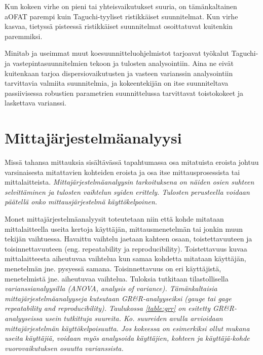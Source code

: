 \documentclass[12pt,a4paper,finnish]{tutthesis}
\begin{document}
Kun kokeen virhe on pieni
tai yhteisvaikutukset suuria, on
tämänkaltainen aOFAT parempi kuin Taguchi-tyyliset ristikkäiset suunnitelmat.
Kun virhe kasvaa, tietyssä pisteessä ristikkäiset suunnitelmat osoittatuvat
kuitenkin paremmiksi.


Minitab ja useimmat muut koesuunnitteluohjelmistot tarjoavat työkalut
Taguchi- ja vastepintasuunnitelmien tekoon ja tulosten analysointiin.
Aina ne eivät kuitenkaan tarjoa dispersiovaikutusten ja vasteen varianssin
analysointiin tarvittavia valmiita suunnitelmia, ja kokeentekijän
on itse suunniteltava passiivisessa robustien parametrien suunnittelussa
tarvittavat toistokokeet ja laskettava varianssi.



\chapter{Mittajärjestelmäanalyysi}
\label{ch:grr}


Missä tahansa mittauksia sisältävässä tapahtumassa osa mitatuista
eroista johtuu varsinaisesta mitattavien kohteiden eroista ja osa itse mittausprosessista
tai mittalaitteista. \em Mittajärjestelmäanalyysin \em tarkoituksena
on näiden osien suhteen selvittäminen ja tulosten vaihtelun syiden erittely.
Tulosten perusteella voidaan päätellä onko mittausjärjestelmä käyttökelpoinen.



Monet mittajärjestelmäanalyysit toteutetaan niin että kohde mitataan
mittalaitteella useita kertoja käyttäjän, mittausmenetelmän tai jonkin muun
tekijän vaihtuessa. Havaittu vaihtelu jaetaan kahteen osaan, toistettavuuteen
ja toisinnettavuuteen (eng. repeatability ja reproducibility). Toistettavuus
kuvaa mittalaitteesta aiheutuvaa vaihtelua kun samaa
kohdetta mitataan käyttäjän, menetelmän jne. pysyessä samana. Toisinnettavuus
on eri käyttäjistä, menetelmistä jne. aiheutuvaa vaihtelua.
Tuloksia tutkitaan tilastollisella \em varianssianalyysilla \em (ANOVA, analysis of variance).
Tämänkaltaisia mittajärjestelmäanalyyseja kutsutaan GR\&R-analyyseiksi
(gauge tai gage repeatability and reproducibility).
Taulukossa \ref{table:grr} on esitetty GR\&R-analyyseissa usein tutkittuja
suureita. Ko. suureiden avulla arvioidaan mittajärjestelmän käyttökelpoisuutta.
Jos kokeessa on esimerkiksi ollut mukana useita käyttäjiä, voidaan myös
analysoida käyttäjien, kohteen ja käyttäjä-kohde vuorovaikutuksen osuutta
varianssista.
\end{document}
